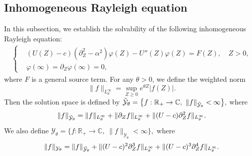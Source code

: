 \documentclass[reqno,11pt]{amsart}
\numberwithin{equation}{section}
\numberwithin{equation}{section}
\theoremstyle{plain}
\begin{document}
\subsection{Inhomogeneous Rayleigh equation}
In this subsection, we establish the solvability of the following inhomogeneous Rayleigh equation:
\begin{align}\label{eq:Ray-force}
	\left\{
	\begin{aligned}
		&(U(Z)-c)(\partial_Z^2-\alpha^2)\varphi (Z)-U''(Z)\varphi (Z)=F(Z),\quad Z>0,\\ &\varphi(\infty)=\partial_Z\varphi(\infty)=0,
	\end{aligned}
	\right.	
\end{align}
where $F$ is a general source term. For any $\theta>0$, we define the weighted norm $$\|f\|_{L^\infty_\theta}=\sup_{Z\geq 0}e^{\theta Z}|f(Z)|.$$ Then the solution space is defined by
$
\Tilde{\mathcal{Y}}_\theta=\big\{f: \mathbb{R}_+\to\mathbb{C},\   \|f\|_{\Tilde{\mathcal{Y}}_\theta}<\infty\big\},
$
where
\begin{align*}
	\|f\|_{\Tilde{\mathcal{Y}}_\theta}=\|f\|_{L_\theta^\infty}+\|\partial_Z f\|_{L_\theta^\infty}+\|(U-c)\partial_Z^2f\|_{L_\theta^\infty}.
\end{align*}
We also define $\mathcal{Y}_\theta=\big\{f: \mathbb{R}_+\to\mathbb{C},\   \|f\|_{\mathcal{Y}_\theta}<\infty\big\},$
where
\begin{align*}
	\|f\|_{\mathcal{Y}_\theta}=	\|f\|_{\Tilde{\mathcal{Y}}_\theta}+
	\|(U-c)^{2}\partial_Z^3 f\|_{L_\theta^\infty}+\|(U-c)^{3}\partial_Z^4 f\|_{L_\theta^\infty}.
\end{align*}
\end{document}
